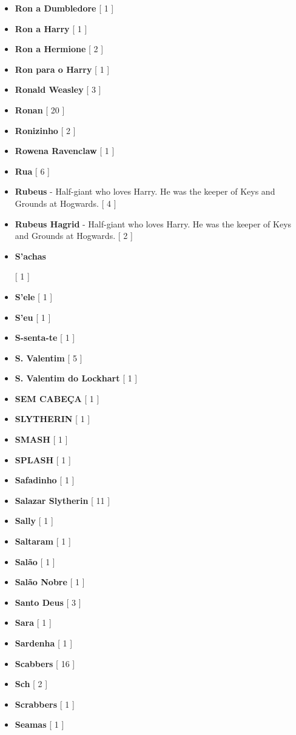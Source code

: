 \documentclass[a4paper]{article}
\begin{document}
\begin{itemize}
	\item \textbf{Ron a Dumbledore} [ 1 ]
	\item \textbf{Ron a Harry} [ 1 ]
	\item \textbf{Ron a Hermione} [ 2 ]
	\item \textbf{Ron para o Harry} [ 1 ]
	\item \textbf{Ronald Weasley} [ 3 ]
	\item \textbf{Ronan} [ 20 ]
	\item \textbf{Ronizinho} [ 2 ]
	\item \textbf{Rowena Ravenclaw} [ 1 ]
	\item \textbf{Rua} [ 6 ]
	\item \textbf{Rubeus} - Half-giant who loves Harry. He was the keeper of Keys and Grounds at Hogwards. [ 4 ]
	\item \textbf{Rubeus Hagrid} - Half-giant who loves Harry. He was the keeper of Keys and Grounds at Hogwards. [ 2 ]
	\item \hypertarget{S}{\textbf{S'achas}} [ 1 ]
	\item \textbf{S'ele} [ 1 ]
	\item \textbf{S'eu} [ 1 ]
	\item \textbf{S-senta-te} [ 1 ]
	\item \textbf{S. Valentim} [ 5 ]
	\item \textbf{S. Valentim do Lockhart} [ 1 ]
	\item \textbf{SEM CABEÇA} [ 1 ]
	\item \textbf{SLYTHERIN} [ 1 ]
	\item \textbf{SMASH} [ 1 ]
	\item \textbf{SPLASH} [ 1 ]
	\item \textbf{Safadinho} [ 1 ]
	\item \textbf{Salazar Slytherin} [ 11 ]
	\item \textbf{Sally} [ 1 ]
	\item \textbf{Saltaram} [ 1 ]
	\item \textbf{Salão} [ 1 ]
	\item \textbf{Salão Nobre} [ 1 ]
	\item \textbf{Santo Deus} [ 3 ]
	\item \textbf{Sara} [ 1 ]
	\item \textbf{Sardenha} [ 1 ]
	\item \textbf{Scabbers} [ 16 ]
	\item \textbf{Sch} [ 2 ]
	\item \textbf{Scrabbers} [ 1 ]
	\item \textbf{Seamas} [ 1 ]

\end{itemize}
\end{document}

